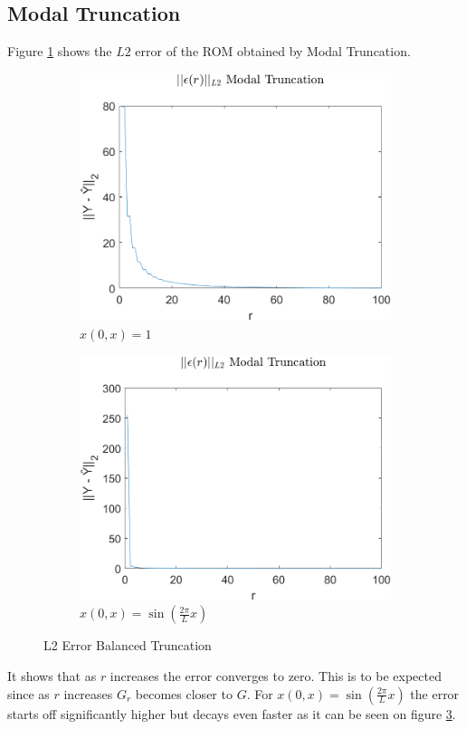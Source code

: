 \subsection{Modal Truncation}
Figure \ref{FIG-ERR-MT} shows the \(L2\) error of the ROM obtained by Modal Truncation.
\begin{figure}[H]
\begin{subfigure}[b]{0.5\textwidth}
\centering
\includegraphics[width=\textwidth]{images/L2_MT}
\caption{$x(0, x) = 1$}
\label{FIG-ERR-MT}
\end{subfigure}
\begin{subfigure}[b]{0.5\textwidth}
\centering
\includegraphics[width=\textwidth]{images/L2_MT_SIN}
\caption{$x(0, x) = \sin(\frac{2\pi}{L}x)$}
\label{FIG-ERR-MT-SIN}
\end{subfigure}
\caption{L2 Error Balanced Truncation}
\end{figure}
It shows that as \(r\) increases the error converges to zero.
This is to be expected since as \(r\) increases \(G_r\) becomes closer to \(G\).
For \(x(0, x) = \sin(\frac{2\pi}{L}x)\) the error starts off significantly higher but decays even faster as it can be seen on figure \ref{FIG-ERR-MT-SIN}.
\newpage

